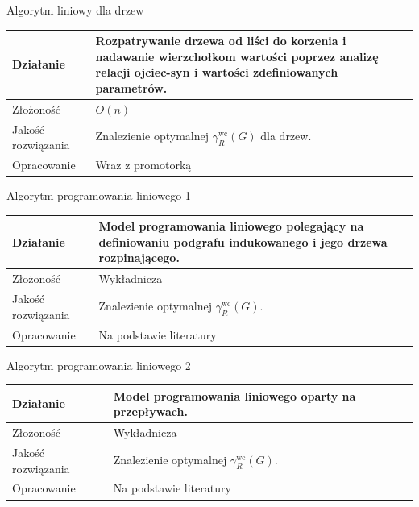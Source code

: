 \documentclass[polish,aspectratio=169]{beamer}
\begin{document}
\begin{frame}{Algorytm liniowy dla drzew}
    \begin{table}
        \centering
        \begin{tabular}{|p{4cm}|p{10cm}|}
        \hline
        Działanie & Rozpatrywanie drzewa od liści do korzenia i nadawanie wierzchołkom wartości poprzez analizę relacji ojciec-syn i wartości zdefiniowanych parametrów. \\
        \hline
        Złożoność &  $O(n)$  \\
        \hline
        Jakość rozwiązania & Znalezienie optymalnej $\gamma^{\mathrm{wc}}_R(G)$ dla drzew.\\
        \hline
        Opracowanie & Wraz z promotorką  \\
        \hline
        \end{tabular}
        \label{tab:liniowy}
    \end{table}
\end{frame}

\begin{frame}{Algorytm programowania liniowego 1}
    \begin{table}
        \centering
        \begin{tabular}{|p{4cm}|p{10cm}|}
        \hline
        Działanie & Model programowania liniowego polegający na definiowaniu podgrafu indukowanego i jego drzewa rozpinającego.  \\
        \hline
        Złożoność & Wykładnicza  \\
        \hline
        Jakość rozwiązania & Znalezienie optymalnej $\gamma^{\mathrm{wc}}_R(G)$.\\
        \hline
        Opracowanie & Na podstawie literatury  \\
        \hline
        \end{tabular}
        \label{tab:ilp}
    \end{table}
\end{frame}

\begin{frame}{Algorytm programowania liniowego 2}
    \begin{table}
        \centering
        \begin{tabular}{|p{4cm}|p{10cm}|}
        \hline
        Działanie & Model programowania liniowego oparty na przepływach.  \\
        \hline
        Złożoność & Wykładnicza  \\
        \hline
        Jakość rozwiązania & Znalezienie optymalnej $\gamma^{\mathrm{wc}}_R(G)$.\\
        \hline
        Opracowanie & Na podstawie literatury  \\
        \hline
        \end{tabular}
        \label{tab:ilp2}
    \end{table}
\end{frame}
\end{document}
